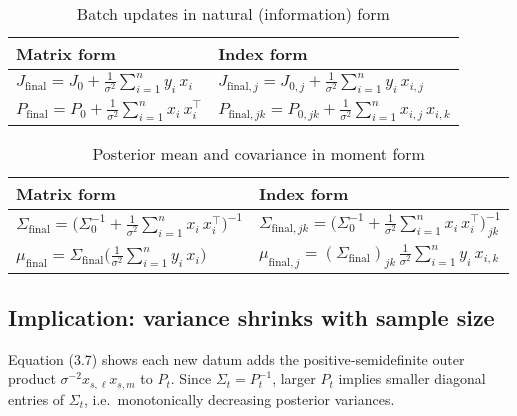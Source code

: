 \documentclass[11pt]{article}
\begin{document}
\begin{table}[ht]
  \centering
  \begin{tabular}{ll}
    \toprule
    Matrix form & Index form \\
    \midrule
    $J_{\mathrm{final}} = J_0 + \displaystyle\frac{1}{\sigma^2}\sum_{i=1}^n y_i\,x_i$
      & $J_{\mathrm{final},j} = J_{0,j} + \displaystyle\frac{1}{\sigma^2}\sum_{i=1}^n y_i\,x_{i,j}$ \\[1ex]
    $P_{\mathrm{final}} = P_0 + \displaystyle\frac{1}{\sigma^2}\sum_{i=1}^n x_i\,x_i^\top$
      & $P_{\mathrm{final},jk} = P_{0,jk} + \displaystyle\frac{1}{\sigma^2}\sum_{i=1}^n x_{i,j}\,x_{i,k}$ \\
    \bottomrule
  \end{tabular}
  \caption{Batch updates in natural (information) form}
  \label{tab:final-natural}
\end{table}

\begin{table}[ht]
  \centering
  \begin{tabular}{ll}
    \toprule
    Matrix form & Index form \\
    \midrule
    $\displaystyle
     \Sigma_{\mathrm{final}}
     = \bigl(\Sigma_0^{-1} + \tfrac{1}{\sigma^2}\!\sum_{i=1}^n x_i\,x_i^\top\bigr)^{-1}$
      & $\displaystyle
        \Sigma_{\mathrm{final},jk}
        = \bigl(\Sigma_0^{-1} + \tfrac{1}{\sigma^2}\!\sum_{i=1}^n x_i\,x_i^\top\bigr)^{-1}_{\,jk}$ \\[1.5ex]
    $\displaystyle
     \mu_{\mathrm{final}}
     = \Sigma_{\mathrm{final}}
       \bigl(\tfrac{1}{\sigma^2}\!\sum_{i=1}^n y_i\,x_i\bigr)$
      & $\displaystyle
        \mu_{\mathrm{final},j}
        = (\Sigma_{\mathrm{final}})_{jk}
          \,\tfrac{1}{\sigma^2}\!\sum_{i=1}^n y_i\,x_{i,k}$ \\
    \bottomrule
  \end{tabular}
  \caption{Posterior mean and covariance in moment form}
  \label{tab:final-moment}
\end{table}


\subsection{Implication: variance shrinks with sample size}

Equation (3.7) shows each new datum adds the positive‐semidefinite outer product $\sigma^{-2}x_{s,\ell}x_{s,m}$ to $P_t$.  Since $\Sigma_t = P_t^{-1}$, larger $P_t$ implies smaller diagonal entries of $\Sigma_t$, i.e.\ monotonically decreasing posterior variances.
\end{document}

